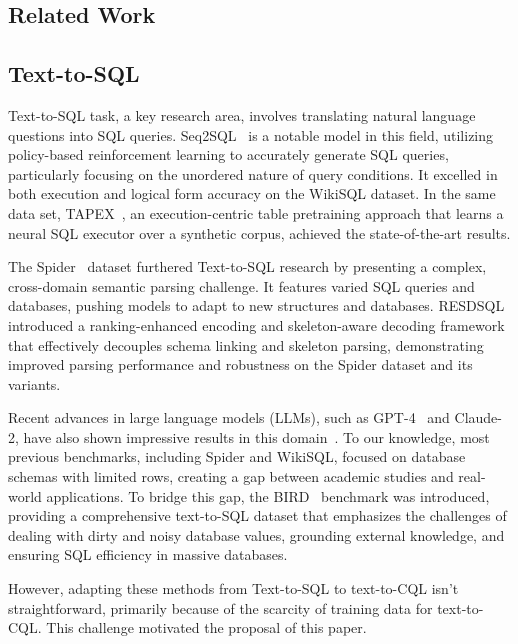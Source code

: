 \documentclass[11pt]{article}
\begin{document}
\begin{CJK*}{UTF8}{gbsn}
\section{Related Work}
\label{sec:related_work}

\subsection{Text-to-SQL}
\label{sec:text2sql}

Text-to-SQL task, a key research area, involves translating natural language questions into SQL queries. 
Seq2SQL~\citep{zhong2017seq2sql} is a notable model in this field, utilizing policy-based reinforcement learning to accurately generate SQL queries, particularly focusing on the unordered nature of query conditions. 
It excelled in both execution and logical form accuracy on the WikiSQL dataset.
In the same data set, TAPEX~\citep{liu2022tapex}, an execution-centric table pretraining approach that learns a neural SQL executor over a synthetic corpus, achieved the state-of-the-art results.

The Spider~\citep{yu-etal-2018-spider} dataset furthered Text-to-SQL research by presenting a complex, cross-domain semantic parsing challenge. 
It features varied SQL queries and databases, pushing models to adapt to new structures and databases. 
RESDSQL~\citep{li2023resdsql} introduced a ranking-enhanced encoding and skeleton-aware decoding framework that effectively decouples schema linking and skeleton parsing, demonstrating improved parsing performance and robustness on the Spider dataset and its variants.

Recent advances in large language models (LLMs), such as GPT-4~\citep{openai2023gpt4} and Claude-2, have also shown impressive results in this domain~\citep{gao2023texttosql, pourreza2023dinsql, dong2023c3}. 
To our knowledge, most previous benchmarks, including Spider and WikiSQL, focused on database schemas with limited rows, creating a gap between academic studies and real-world applications. 
To bridge this gap, the BIRD~\citep{li2023can} benchmark was introduced, providing a comprehensive text-to-SQL dataset that emphasizes the challenges of dealing with dirty and noisy database values, grounding external knowledge, and ensuring SQL efficiency in massive databases.

However, adapting these methods from Text-to-SQL to text-to-CQL isn't straightforward, primarily because of the scarcity of training data for text-to-CQL. 
This challenge motivated the proposal of this paper.


\end{CJK*}
\end{document}

